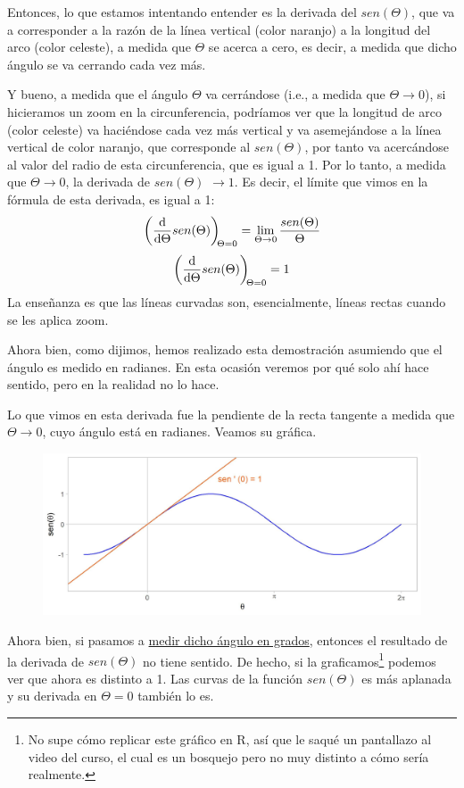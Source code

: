 \documentclass[12pt]{article}
\begin{document}
Entonces, lo que estamos intentando entender es la derivada del $sen(\Theta)$, que va a corresponder a la razón de la línea vertical (color naranjo) a la longitud del arco (color celeste), a medida que $\Theta$ se acerca a cero, es decir, a medida que dicho ángulo se va cerrando cada vez más.

Y bueno, a medida que el ángulo $\Theta$ va cerrándose (i.e., a medida que $\Theta \to 0$), si hicieramos un zoom en la circunferencia, podríamos ver que la longitud de arco (color celeste) va haciéndose cada vez más vertical y va asemejándose a la línea vertical de color naranjo, que corresponde al $sen(\Theta)$, por tanto va acercándose al valor del radio de esta circunferencia, que es igual a 1. Por lo tanto, a medida que $\Theta \to 0$, la derivada de $sen(\Theta)$ $\to 1$. Es decir, el límite que vimos en la fórmula de esta derivada, es igual a 1:
\[\diff*{sen(\Theta)}\Theta[\Theta = 0] = \lim_{\Theta \to 0} \frac{sen(\Theta)}{\Theta}\]
\[\diff*{sen(\Theta)}\Theta[\Theta = 0] = 1\]
La enseñanza es que las líneas curvadas son, esencialmente, líneas rectas cuando se les aplica zoom.

Ahora bien, como dijimos, hemos realizado esta demostración asumiendo que el ángulo es medido en radianes. En esta ocasión veremos por qué solo ahí hace sentido, pero en la realidad no lo hace.

Lo que vimos en esta derivada fue la pendiente de la recta tangente a medida que $\Theta \to 0$, cuyo ángulo está en radianes. Veamos su gráfica.

\begin{figure}[hbt!]
\centering
\includegraphics[scale=0.7]{img/deriv_sin_theta.jpg}
\end{figure}

Ahora bien, si pasamos a \underline{medir dicho ángulo en grados}, entonces el resultado de la derivada de $sen(\Theta)$ no tiene sentido. De hecho, si la graficamos\footnote{No supe cómo replicar este gráfico en R, así que le saqué un pantallazo al video del curso, el cual es un bosquejo pero no muy distinto a cómo sería realmente.} podemos ver que ahora es distinto a 1. Las curvas de la función $sen(\Theta)$ es más aplanada y su derivada en $\Theta = 0$ también lo es.
\end{document}
